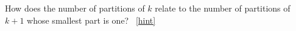 \documentclass{book}
\begin{document}
\setcounter{project}{213}
\addtocounter{project}{-1}
\begin{activity}[]\label{activity-206}
\hypertarget{p-1187}{}%
How does the number of partitions of \(k\) relate to the number of partitions of \(k+1\) whose smallest part is one?%
~\hfill{\tiny\hyperlink{a-213}{[hint]}\hypertarget{q-213}{}}\end{activity}
\end{document}
